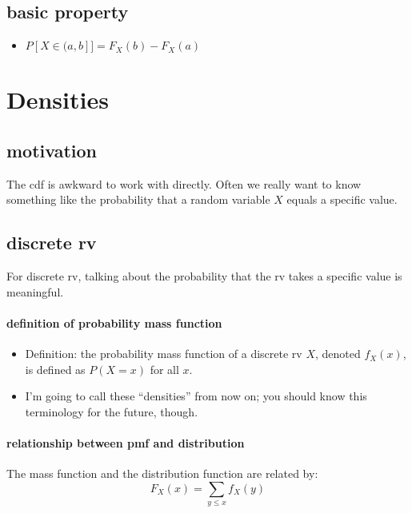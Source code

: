 \subsection{basic property}

\begin{itemize}
\item $P[X \in (a, b]] = F_X(b) - F_X(a)$
\end{itemize}

\section{Densities}

\subsection{motivation}

     The cdf is awkward to work with directly.  Often we really want to
     know something like the probability that a random variable $X$
     equals a specific value.

\subsection{discrete rv}

     For discrete rv, talking about the probability that the rv takes a
     specific value is meaningful.

\paragraph{definition of probability mass function}

\begin{itemize}
\item Definition: the probability mass function of a discrete rv
        $X$, denoted $f_X(x)$, is defined as $P(X = x)$ for all $x$.
\item I'm going to call these ``densities'' from now on; you should know
        this terminology for the future, though.
\end{itemize}

\paragraph{relationship between pmf and distribution}

      The mass function and the distribution function are related by:
      \[F_X(x) = \sum_{y \leq x} f_X(y)\]

